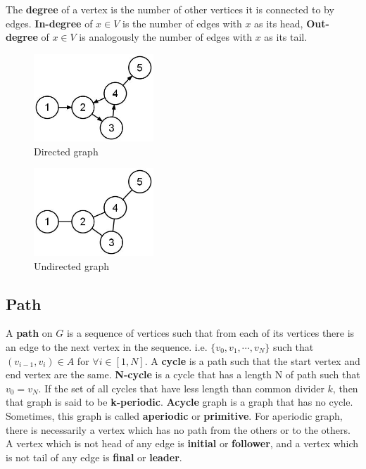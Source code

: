 \documentclass[11pt, a4paper, oneside, openany, reqno]{book}
\theoremstyle{definition}
\theoremstyle{remark}
\numberwithin{equation}{chapter} %
\begin{document}
The \textbf{degree} of a vertex is the number of other vertices it is connected to by edges.
\textbf{In-degree} of $ x \in V $ is the number of edges with $ x $ as its head, 
\textbf{Out-degree} of $ x \in V $ is analogously the number of edges with $ x $ as its tail.

\begin{figure}[htp]
	\centering
	\includegraphics[width=0.40\textwidth]{graph1.png}
	\caption{Directed graph}\label{digraph}
\end{figure}

\begin{figure}[htp]
	\centering
	\includegraphics[width=0.40\textwidth]{graph4.png}
	\caption{Undirected graph}\label{undigraph}
\end{figure}

\subsection{Path}
A \textbf{path} on $ G $ is a sequence of vertices such that 
from each of its vertices there is an edge to the next vertex in the sequence. 
i.e. $ \lbrace v_0,v_1,\cdots,v_N \rbrace$ 
such that $ (v_{i-1},v_i) \in A $ for $\forall i \in \left[ 1,N \right]$.
A \textbf{cycle} is a path such that the start vertex and end vertex are the same.
\textbf{N-cycle} is a cycle that has a length N of path such that $ v_0 =v_N $.
If the set of all cycles that have less length than common divider $ k $, 
then that graph is said to be \textbf{k-periodic}. 
\textbf{Acycle} graph is a graph that has no cycle. 
Sometimes, this graph is called \textbf{aperiodic} or \textbf{primitive}.
For aperiodic graph, there is necessarily a vertex 
which has no path from the others or to the others.
A vertex which is not head of any edge is \textbf{initial} or \textbf{follower}, 
and a vertex which is not tail of any edge is \textbf{final} or \textbf{leader}.
\end{document}
